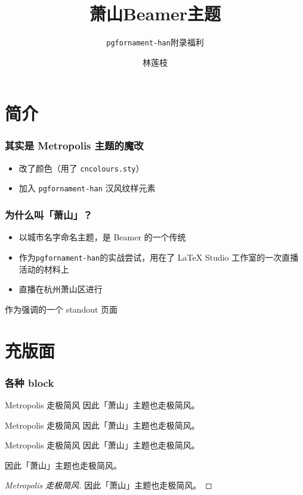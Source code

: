 \documentclass{ctexbeamer}
\author{林莲枝}
\title{萧山Beamer主题}
\subtitle{\texttt{pgfornament-han}附录福利}
\begin{document}
\begin{frame}
  \maketitle
\end{frame}

\section{简介}

\begin{frame}
  \frametitle{其实是 Metropolis 主题的魔改}
  \begin{itemize}
    \item 改了颜色（用了 \texttt{cncolours.sty}）
    \item 加入 \texttt{pgfornament-han} 汉风纹样元素
  \end{itemize}
\end{frame}

\begin{frame}
  \frametitle{为什么叫「萧山」？}
  \begin{itemize}
    \item 以城市名字命名主题，是 Beamer 的一个传统
    \item 作为\texttt{pgfornament-han}的实战尝试，用在了 \LaTeX{} Studio 工作室的一次直播活动的材料上
    \item 直播在{\kaishu 杭州萧山区}进行
  \end{itemize}
\end{frame}

\begin{frame}[standout]
作为强调的一个 standout 页面
\end{frame}

\section{充版面}

\begin{frame}[allowframebreaks]
  \frametitle{各种 block}

  \begin{block}{Metropolis 走极简风}
    因此「萧山」主题也走极简风。
  \end{block}

  \begin{exampleblock}{Metropolis 走极简风}
    因此「萧山」主题也走极简风。
  \end{exampleblock}

  \begin{alertblock}{Metropolis 走极简风}
    因此「萧山」主题也走极简风。
  \end{alertblock}

  \begin{theorem}
    因此「萧山」主题也走极简风。
  \end{theorem}

  \begin{proof}[Metropolis 走极简风]
    因此「萧山」主题也走极简风。
  \end{proof}
\end{frame}
\end{document}
